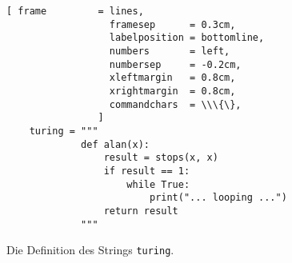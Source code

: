 \begin{figure}[!h]
  \centering
\begin{Verbatim}[ frame         = lines, 
                  framesep      = 0.3cm, 
                  labelposition = bottomline,
                  numbers       = left,
                  numbersep     = -0.2cm,
                  xleftmargin   = 0.8cm,
                  xrightmargin  = 0.8cm,
                  commandchars  = \\\{\},
                ]
    turing = """
             def alan(x):
                 result = stops(x, x)
                 if result == 1:
                     while True:
                         print("... looping ...")
                 return result
             """ 
\end{Verbatim}
  \vspace*{-0.3cm}
  \caption{Die Definition des Strings \texttt{turing}.}
  \label{fig:turing-string}
\end{figure}

